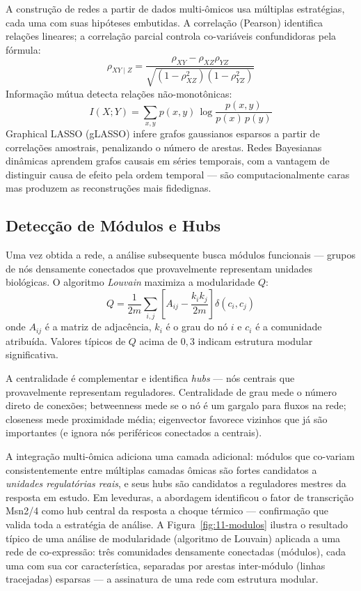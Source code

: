 A construção de redes a partir de dados multi-ômicos usa múltiplas
estratégias, cada uma com suas hipóteses embutidas. A correlação (Pearson)
identifica relações lineares; a correlação parcial controla co-variáveis
confundidoras pela fórmula:
\begin{equation}
\rho_{XY \mid Z} = \frac{\rho_{XY} - \rho_{XZ}\rho_{YZ}}
                        {\sqrt{(1 - \rho_{XZ}^2)(1 - \rho_{YZ}^2)}}
\end{equation}
Informação mútua detecta relações não-monotônicas:
\begin{equation}
I(X;Y) = \sum_{x, y} p(x, y)\, \log \frac{p(x, y)}{p(x)\, p(y)}
\end{equation}
Graphical LASSO (gLASSO) infere grafos gaussianos esparsos a partir de
correlações amostrais, penalizando o número de arestas. Redes Bayesianas
dinâmicas aprendem grafos causais em séries temporais, com a vantagem
de distinguir causa de efeito pela ordem temporal --- são computacionalmente
caras mas produzem as reconstruções mais fidedignas.

\subsection{Detecção de Módulos e Hubs}
\label{sub:image11-modulos}

Uma vez obtida a rede, a análise subsequente busca módulos funcionais ---
grupos de nós densamente conectados que provavelmente representam unidades
biológicas. O algoritmo \emph{Louvain} maximiza a modularidade $Q$:
\begin{equation}
Q = \frac{1}{2m}\sum_{i, j} \left[ A_{ij} - \frac{k_i k_j}{2m} \right]
                           \delta(c_i, c_j)
\end{equation}
onde $A_{ij}$ é a matriz de adjacência, $k_i$ é o grau do nó $i$ e $c_i$ é
a comunidade atribuída. Valores típicos de $Q$ acima de $0{,}3$ indicam
estrutura modular significativa.

A centralidade é complementar e identifica \emph{hubs} --- nós centrais que
provavelmente representam reguladores. Centralidade de grau mede o número
direto de conexões; betweenness mede se o nó é um gargalo para fluxos na
rede; closeness mede proximidade média; eigenvector favorece vizinhos que
já são importantes (e ignora nós periféricos conectados a centrais).

A integração multi-ômica adiciona uma camada adicional: módulos que
co-variam consistentemente entre múltiplas camadas ômicas são fortes
candidatos a \emph{unidades regulatórias reais}, e seus hubs são candidatos
a reguladores mestres da resposta em estudo. Em leveduras, a abordagem
identificou o fator de transcrição Msn2/4 como hub central da resposta a
choque térmico --- confirmação que valida toda a estratégia de análise. A
Figura~\ref{fig:11-modulos} ilustra o resultado típico de uma análise
de modularidade (algoritmo de Louvain) aplicada a uma rede de
co-expressão: três comunidades densamente conectadas (módulos), cada
uma com sua cor característica, separadas por arestas inter-módulo
(linhas tracejadas) esparsas --- a assinatura de uma rede com estrutura
modular.

